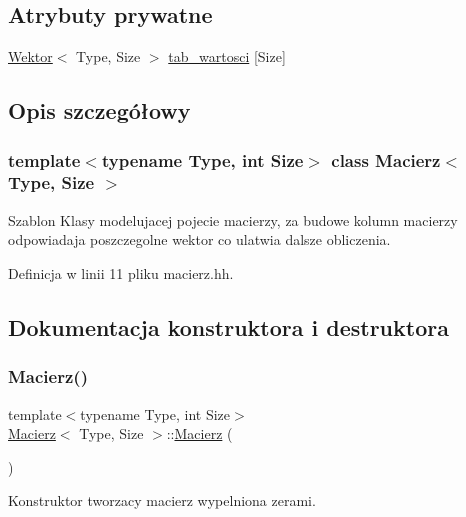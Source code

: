 \subsection*{Atrybuty prywatne}
\begin{DoxyCompactItemize}
\item 
\hyperlink{class_wektor}{Wektor}$<$ Type, Size $>$ \hyperlink{class_macierz_afa921845c2803b6105c5ac0ae3defa3d}{tab\+\_\+wartosci} \mbox{[}Size\mbox{]}
\end{DoxyCompactItemize}


\subsection{Opis szczegółowy}
\subsubsection*{template$<$typename Type, int Size$>$\newline
class Macierz$<$ Type, Size $>$}

Szablon Klasy modelujacej pojecie macierzy, za budowe kolumn macierzy odpowiadaja poszczegolne wektor co ulatwia dalsze obliczenia. 

Definicja w linii 11 pliku macierz.\+hh.



\subsection{Dokumentacja konstruktora i destruktora}
\mbox{\label{class_macierz_af94b65613b430a10008d6755597a0427}} 
\subsubsection{\texorpdfstring{Macierz()}{Macierz()}}
{\footnotesize\ttfamily template$<$typename Type, int Size$>$ \\
\hyperlink{class_macierz}{Macierz}$<$ Type, Size $>$\+::\hyperlink{class_macierz}{Macierz} (\begin{DoxyParamCaption}{ }\end{DoxyParamCaption})\hspace{0.3cm}{\ttfamily [inline]}}



Konstruktor tworzacy macierz wypelniona zerami. 




